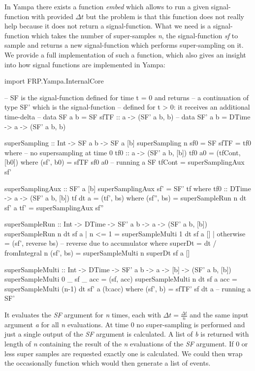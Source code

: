 In Yampa there exists a function \textit{embed} which allows to run a given signal-function with provided $\Delta t$ but the problem is that this function does not really help because it does not return a signal-function. What we need is a signal-function which takes the number of super-samples \textit{n}, the signal-function \textit{sf} to sample and returns a new signal-function which performs super-sampling on it. We provide a full implementation of such a function, which also gives an insight into how signal functions are implemented in Yampa:

\begin{HaskellCode}
import FRP.Yampa.InternalCore

-- SF is the signal-function defined for time t = 0 and returns
-- a continuation of type SF' which is the signal-function 
-- defined for t > 0: it receives an additional time-delta
-- data SF a b  = SF { sfTF :: a -> (SF' a b, b) }
-- data SF' a b = DTime -> a -> (SF' a b, b)

superSampling :: Int -> SF a b -> SF a [b]
superSampling n sf0 = SF { sfTF = tf0 }
  where
    -- no supersampling at time 0
    tf0 :: a -> (SF' a b, [b])
    tf0 a0 = (tfCont, [b0])
      where
        (sf', b0) = sfTF sf0 a0 -- running a SF
        tfCont    = superSamplingAux sf'

    superSamplingAux :: SF' a [b]
    superSamplingAux sf' = SF' tf
      where
      	tf0 :: DTime -> a -> (SF' a b, [b])
        tf dt a = (tf', bs)
          where
            (sf'', bs) = superSampleRun n dt sf' a
            tf'        = superSamplingAux sf''

    superSampleRun :: Int -> DTime -> SF' a b -> a -> (SF' a b, [b])
    superSampleRun n dt sf a 
        | n <= 1    = superSampleMulti 1 dt sf a []
        | otherwise = (sf', reverse bs)  -- reverse due to accumulator
      where
        superDt = dt / fromIntegral n
        (sf', bs) = superSampleMulti n superDt sf a []

    superSampleMulti :: Int -> DTime -> SF' a b -> a -> [b] -> (SF' a b, [b])
    superSampleMulti 0 _ sf _ acc  = (sf, acc)
    superSampleMulti n dt sf a acc = superSampleMulti (n-1) dt sf' a (b:acc) 
      where
        (sf', b) = sfTF' sf dt a -- running a SF'
\end{HaskellCode}

It evaluates the \textit{SF} argument for \textit{n} times, each with $\Delta t = \frac{\Delta t}{n}$ and the same input argument \textit{a} for all \textit{n} evaluations. At time 0 no super-sampling is performed and just a single output of the \textit{SF} argument is calculated. A list of \textit{b} is returned with length of \textit{n} containing the result of the \textit{n} evaluations of the \textit{SF} argument. If 0 or less super samples are requested exactly one is calculated. We could then wrap the occasionally function which would then generate a list of events. 


